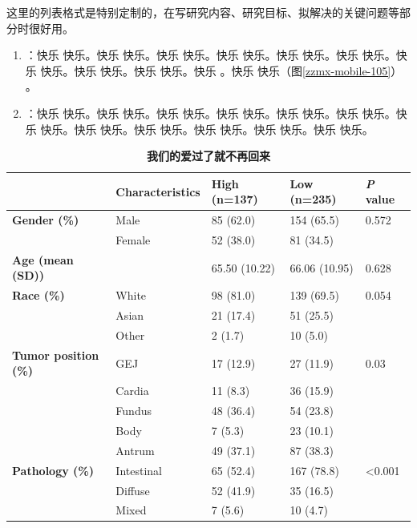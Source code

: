 这里的列表格式是特别定制的，在写研究内容、研究目标、拟解决的关键问题等部分时很好用。

\begin{enumerate}
    \item {}：快乐 快乐。快乐 快乐。快乐 快乐。快乐 快乐。快乐 快乐。快乐 快乐。快乐 快乐。快乐 快乐。快乐 快乐。快乐 。快乐 快乐（图\ref{zzmx-mobile-105}） 。
    \item {}：快乐 快乐。快乐 快乐。快乐 快乐。快乐 快乐。快乐 快乐。快乐 快乐。快乐 快乐。快乐 快乐。快乐 快乐。快乐 快乐。快乐 快乐。快乐 快乐。
\end{enumerate}


\begin{table}[htbp]
    \centering
    \fontsize{11}{11}\selectfont
    \caption{\textbf{我们的爱过了就不再回来}}
    \begin{tabular}{lllll}
    \toprule
            & \textbf{Characteristics} & \textbf{High (n=137)} & \textbf{Low (n=235)} & \textbf{\textit{P} value} \\
    \toprule
    \textbf{Gender (\%)} & Male  & 85 (62.0) & 154 (65.5) & 0.572 \\
            & Female & 52 (38.0) & 81 (34.5) &  \\
    \textbf{Age (mean (SD))} &       & 65.50 (10.22) & 66.06 (10.95) & 0.628 \\
    \textbf{Race (\%)} & White & 98 (81.0) & 139 (69.5) & 0.054 \\
            & Asian & 21 (17.4) & 51 (25.5) &  \\
            & Other & 2 (1.7) & 10 (5.0) &  \\
    \textbf{Tumor position (\%)} & GEJ   & 17 (12.9) & 27 (11.9) & 0.03 \\
            & Cardia & 11 (8.3) & 36 (15.9) &  \\
            & Fundus & 48 (36.4) & 54 (23.8) &  \\
            & Body  & 7 (5.3) & 23 (10.1) &  \\
            & Antrum & 49 (37.1) & 87 (38.3) &  \\
    \textbf{Pathology (\%)} & Intestinal & 65 (52.4) & 167 (78.8) & <0.001 \\
            & Diffuse & 52 (41.9) & 35 (16.5) &  \\
            & Mixed & 7 (5.6) & 10 (4.7) &  \\

\end{tabular}
\end{table}
